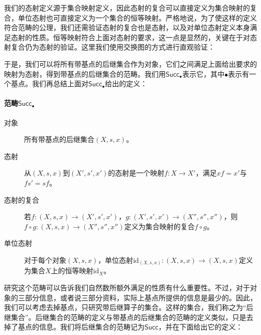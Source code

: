 \documentclass[oneside, 12pt]{ctexart}
\begin{document}
我们的态射定义源于集合映射定义，因此态射的复合可以直接定义为集合映射的复合，单位态射也可直接定义为一个集合的恒等映射。严格地说，为了使这样的定义符合范畴的公理，我们还需验证态射的复合也是态射，以及对单位态射定义本身满足态射的性质。恒等映射符合上面对态射的要求，这一点是显然的，关键在于对态射复合仍为态射的验证。这里我们使用交换图的方式进行直观验证：
\begin{center}
\end{center}

于是，我们可以将所有带基点的后继集合作为对象，它们之间满足上面给出要求的映射为态射，得到带基点的后继集合的范畴。我们用$\mathsf{Succ_\bullet}$表示它，其中$\bullet$表示有一个基点。我们再总结上面对$\mathsf{Succ_\bullet}$给出的定义：

\paragraph{范畴$\mathsf{Succ_\bullet}$}
\begin{description}
	\item[对象] 所有带基点的后继集合$(X, s, x)$。
	\item[态射] 从$(X, s, x)$到$(X', s', x')$的态射是一个映射$f \colon X \to X'$，满足$xf = x'$与$fs' = sf$。
	\item[态射的复合] 若$f \colon (X, s, x) \to (X', s', x')$，$g \colon (X', s', x') \to (X'', s'', x'')$，则$f \circ g \colon (X, s, x) \to (X'', s'', x'')$定义为集合映射的复合$f \circ g$。
	\item[单位态射] 对于每个对象$(X, s, x)$，单位态射$\text{id}_{(X, s, x)} \colon (X, s, x) \to (X, s, x)$定义为集合$X$上的恒等映射$\text{id}_X$。
\end{description}

研究这个范畴可以告诉我们自然数所额外满足的性质有什么重要性。不过，对于对象的三部分信息，或者说三部分资料，实际上基点所提供的信息是最少的。因此，我们可以考虑去掉基点，只研究带后继算子的集合。这样的集合，我们称之为“后继集合”。后继集合的范畴的定义与带基点的后继集合的范畴的定义类似，只是去掉了基点的信息。我们将后继集合的范畴记为$\mathsf{Succ}$，并在下面给出它的定义：
\end{document}
